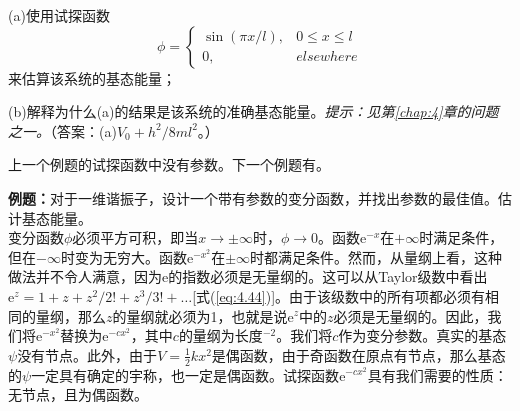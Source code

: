 \begin{examplebox}
        (a)使用试探函数
        \begin{equation*}
            \phi = \begin{cases}
                \sin\left(\pi x/l\right), & 0 \leq x \leq l \\
                0, & elsewhere
            \end{cases}
        \end{equation*}
        来估算该系统的基态能量；

        (b)解释为什么(a)的结果是该系统的准确基态能量。\textit{提示：见第\ref{chap:4}章的问题之一。}（答案：(a)$V_0 + h^2/8ml^2$。）
    \end{examplebox}

    上一个例题的试探函数中没有参数。下一个例题有。

    \begin{examplebox}
        \textbf{例题：}对于一维谐振子，设计一个带有参数的变分函数，并找出参数的最佳值。估计基态能量。
        \\

        变分函数$\phi$必须平方可积，即当$x \to \pm \infty$时，$\phi \to 0$。函数$\mathrm{e}^{-x}$在$+ \infty$时满足条件，但在$-\infty$时变为无穷大。函数$\mathrm{e}^{-x^2}$在$\pm \infty$时都满足条件。然而，从量纲上看，这种做法并不令人满意，因为$\mathrm{e}$的指数必须是无量纲的。这可以从Taylor级数中看出$\mathrm{e}^z = 1 + z + z^2/2! + z^3/3! + \ldots$[式(\ref{eq:4.44})]。由于该级数中的所有项都必须有相同的量纲，那么$z$的量纲就必须为1，也就是说$\mathrm{e}^z$中的$z$必须是无量纲的。因此，我们将$\mathrm{e}^{-x^2}$替换为$\mathrm{e}^{-cx^2}$，其中$c$的量纲为长度$^{-2}$。我们将$c$作为变分参数。真实的基态$\psi$没有节点。此外，由于$V = \frac{1}{2}kx^2$是偶函数，由于奇函数在原点有节点，那么基态的$\psi$一定具有确定的宇称，也一定是偶函数。试探函数$\mathrm{e}^{-cx^2}$具有我们需要的性质：无节点，且为偶函数。


\end{examplebox}
